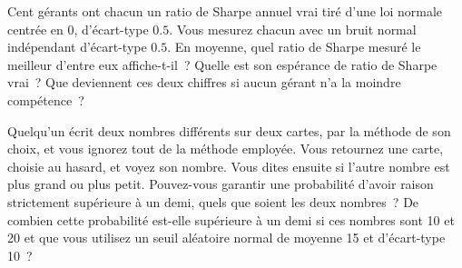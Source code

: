 \begin{question}\label{iq:iv1:conditional-probability-and-bayes:39}
Cent gérants ont chacun un ratio de Sharpe annuel vrai tiré d'une loi normale centrée en 0, d'écart-type $0.5$. Vous mesurez chacun avec un bruit normal indépendant d'écart-type $0.5$. En moyenne, quel ratio de Sharpe mesuré le meilleur d'entre eux affiche-t-il~? Quelle est son espérance de ratio de Sharpe vrai~? Que deviennent ces deux chiffres si aucun gérant n'a la moindre compétence~?
\end{question}

\begin{question}\label{iq:iv1:conditional-probability-and-bayes:40}
Quelqu'un écrit deux nombres différents sur deux cartes, par la méthode de son choix, et vous ignorez tout de la méthode employée. Vous retournez une carte, choisie au hasard, et voyez son nombre. Vous dites ensuite si l'autre nombre est plus grand ou plus petit. Pouvez-vous garantir une probabilité d'avoir raison strictement supérieure à un demi, quels que soient les deux nombres~? De combien cette probabilité est-elle supérieure à un demi si ces nombres sont 10 et 20 et que vous utilisez un seuil aléatoire normal de moyenne 15 et d'écart-type 10~?
\end{question}
